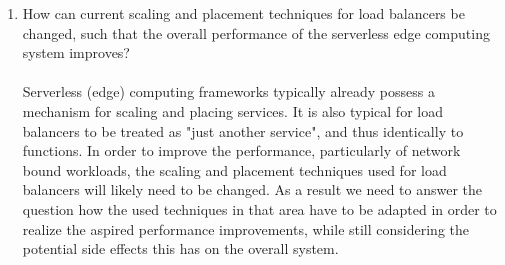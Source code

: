\begin{enumerate}
    \item How can current scaling and placement techniques for load balancers be changed, such that the overall performance of the serverless edge computing system improves?\\\\
    Serverless (edge) computing frameworks typically already possess a mechanism for scaling and placing services. It is also typical for load balancers to be treated as "just another service", and thus identically to functions\cite{openfaas}. 
    In order to improve the performance, particularly of network bound workloads, the scaling and placement techniques used for load balancers will likely need to be changed. As a result we need to answer the question how the used techniques in that area have to be adapted in order to realize the aspired performance improvements, while still considering the potential side effects this has on the overall system.
    
\end{enumerate}